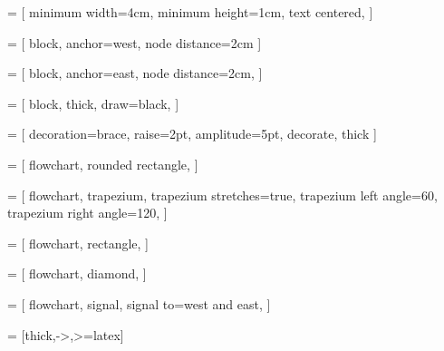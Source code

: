 

 = [%
    minimum width=4cm,
    minimum height=1cm,
    text centered,
]

 = [ %
    block,
    anchor=west,
    node distance=2cm
]

 = [ %
    block,
    anchor=east,
    node distance=2cm,
]

 = [%
    block,
    thick,
    draw=black,
]

 = [%
    decoration={brace, raise=2pt, amplitude=5pt},
    decorate,
    thick
]

 = [%
    flowchart,
    rounded rectangle,
]

 = [%
    flowchart,
    trapezium,
    trapezium stretches=true,
    trapezium left angle=60,
    trapezium right angle=120,
]

 = [%
    flowchart,
    rectangle,
]

 = [%
    flowchart,
    diamond,
]

 = [
    flowchart,
    signal,
    signal to=west and east,
]

 = [thick,->,>=latex]




